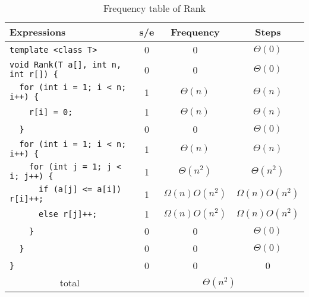 \documentclass{article}
\begin{document}
\begin{table}[H]
    \centering
    \begin{tabular}{|l|c|c|c|}
        \hline
        Expressions                               & s/e                                 & Frequency         & Steps             \\
        \hline
        \verb|template <class T>|                 & 0                                   & 0                 & $\Theta(0)$       \\
        \verb|void Rank(T a[], int n, int r[]) {| & 0                                   & 0                 & $\Theta(0)$       \\
        \verb|  for (int i = 1; i < n; i++) {|    & 1                                   & $\Theta(n)$       & $\Theta(n)$       \\
        \verb|    r[i] = 0;|                      & 1                                   & $\Theta(n)$       & $\Theta(n)$       \\
        \verb|  }|                                & 0                                   & 0                 & $\Theta(0)$       \\
        \verb|  for (int i = 1; i < n; i++) {|    & 1                                   & $\Theta(n)$       & $\Theta(n)$       \\
        \verb|    for (int j = 1; j < i; j++) {|  & 1                                   & $\Theta(n^2)$     & $\Theta(n^2)$     \\
        \verb|      if (a[j] <= a[i]) r[i]++;|    & 1                                   & $\Omega(n)O(n^2)$ & $\Omega(n)O(n^2)$ \\
        \verb|      else r[j]++;|                 & 1                                   & $\Omega(n)O(n^2)$ & $\Omega(n)O(n^2)$ \\
        \verb|    }|                              & 0                                   & 0                 & $\Theta(0)$       \\
        \verb|  }|                                & 0                                   & 0                 & $\Theta(0)$       \\
        \verb|}|                                  & 0                                   & 0                 & 0                 \\
        \hline
        \multicolumn{1}{|c|}{total}               & \multicolumn{3}{|c|}{$\Theta(n^2)$}                                         \\
        \hline
    \end{tabular}
    \caption{Frequency table of Rank}
\end{table}
\end{document}
